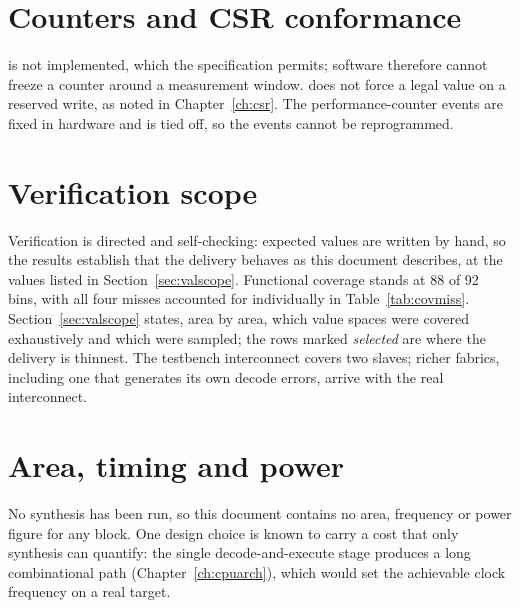 \section{Counters and CSR conformance}

 is not implemented, which the specification permits; software
therefore cannot freeze a counter around a measurement window.
 does not force a legal value on a reserved write, as noted in
Chapter~\ref{ch:csr}. The performance-counter events are fixed in hardware and
 is tied off, so the events cannot be reprogrammed.

\section{Verification scope}

Verification is directed and self-checking: expected values are written by
hand, so the results establish that the delivery behaves as this document
describes, at the values listed in Section~\ref{sec:valscope}. Functional
coverage stands at 88 of 92 bins, with all four misses accounted for
individually in Table~\ref{tab:covmiss}. Section~\ref{sec:valscope} states, area
by area, which value spaces were covered exhaustively and which were sampled;
the rows marked \emph{selected} are where the delivery is thinnest. The
testbench interconnect covers two slaves; richer fabrics, including one that
generates its own decode errors, arrive with the real interconnect.

\section{Area, timing and power}

No synthesis has been run, so this document contains no area, frequency or power
figure for any block. One design choice is known to carry a cost that only
synthesis can quantify: the single decode-and-execute stage produces a long
combinational path (Chapter~\ref{ch:cpuarch}), which would set the achievable
clock frequency on a real target.
